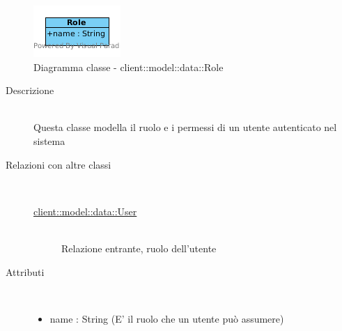 \vspace{0.5cm}
\hypertarget{client::model::data::Role}{}
\begin{center}
			\begin{figure}[H]
				\centering \includegraphics[scale=4, max width=\textwidth, max height=\myheight]{../img/diagrammiClassi/client/model/data/Role.png}
				\caption{Diagramma classe - client::model::data::Role}
			\end{figure}
		\end{center}\begin{description}
\item[Descrizione] \hfill \\
 Questa classe modella il ruolo e i permessi di un utente autenticato nel sistema
\item[Relazioni con altre classi] \hfill \\
 \vspace{-7mm}
\begin{description}
\item[\hyperlink{client::model::data::User}{client::model::data::User}] \hfill \\
 Relazione entrante, ruolo dell'utente
\end{description}

\item[Attributi] \hfill \\
 \vspace{-7mm}
\begin{itemize}
\item name : String (E' il ruolo che un utente può assumere)
\end{itemize}

\end{description}

